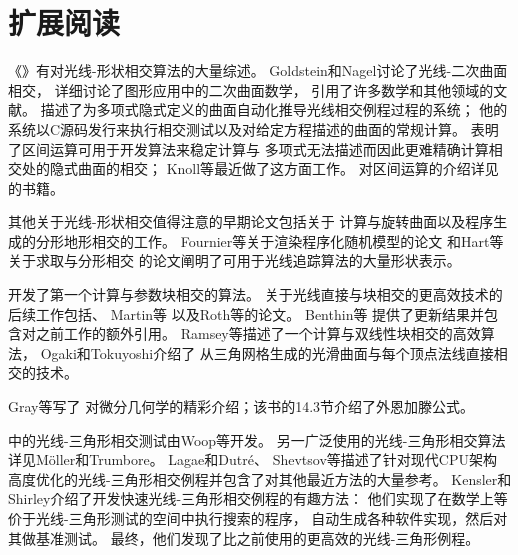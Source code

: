 \section{扩展阅读}\label{sec:扩展阅读03}
《》有对光线-形状相交算法的大量综述\citep{10.5555/94788}。
Goldstein和Nagel\parencite*{doi:10.1177/003754977101600104}讨论了光线-二次曲面相交，
\citet{Heckbert84themathematics}详细讨论了图形应用中的二次曲面数学，
引用了许多数学和其他领域的文献。
\citet{10.1145/964967.801136}描述了为多项式隐式定义的曲面自动化推导光线相交例程过程的系统；
他的系统以C源码发行来执行相交测试以及对给定方程描述的曲面的常规计算。
\citet{10.5555/93267.93276}表明了区间运算可用于开发算法来稳定计算与
多项式无法描述而因此更难精确计算相交处的隐式曲面的相交；
Knoll等\parencite*{10.1111/j.1467-8659.2008.01189.x}最近做了这方面工作。
对区间运算的介绍详见\citet{moore1966interval}的书籍。

其他关于光线-形状相交值得注意的早期论文包括\citet{10.1145/800059.801137}关于
计算与旋转曲面以及程序生成的分形地形相交的工作。
Fournier等\parencite*{10.1145/358523.358553}关于渲染程序化随机模型的论文
和Hart等\parencite*{10.1145/74334.74363}关于求取与分形相交
的论文阐明了可用于光线追踪算法的大量形状表示。

\citet{10.1145/800064.801287}开发了第一个计算与参数块相交的算法。
关于光线直接与块相交的更高效技术的后续工作包括\citet{722295}、
Martin等\parencite*{doi:10.1080/10867651.2000.10487519}
以及Roth等\parencite*{https://doi.org/10.1111/1467-8659.00535}的论文。
Benthin等\parencite*{doi:10.1080/2151237X.2006.10129218}
提供了更新结果并包含对之前工作的额外引用。
Ramsey等\parencite*{doi:10.1080/10867651.2004.10504896}描述了一个计算与双线性块相交的高效算法，
Ogaki和Tokuyoshi\parencite*{10.1111/j.1467-8659.2011.01993.x}介绍了
从三角网格生成的光滑曲面与每个顶点法线直接相交的技术。

Gray等\parencite*{gray2017modern}写了
对微分几何学的精彩介绍；该书的14.3节介绍了外恩加滕公式。

中的光线-三角形相交测试由Woop等\parencite*{Woop2013Watertight}开发。
另一广泛使用的光线-三角形相交算法详见Möller和Trumbore\parencite*{doi:10.1080/10867651.1997.10487468}。
Lagae和Dutré\parencite*{doi:10.1080/2151237X.2005.10129208}、
Shevtsov等\parencite*{shevtsov2007ray}描述了针对现代CPU架构
高度优化的光线-三角形相交例程并包含了对其他最近方法的大量参考。
Kensler和Shirley\parencite*{4061543}介绍了开发快速光线-三角形相交例程的有趣方法：
他们实现了在数学上等价于光线-三角形测试的空间中执行搜索的程序，
自动生成各种软件实现，然后对其做基准测试。
最终，他们发现了比之前使用的更高效的光线-三角形例程。

